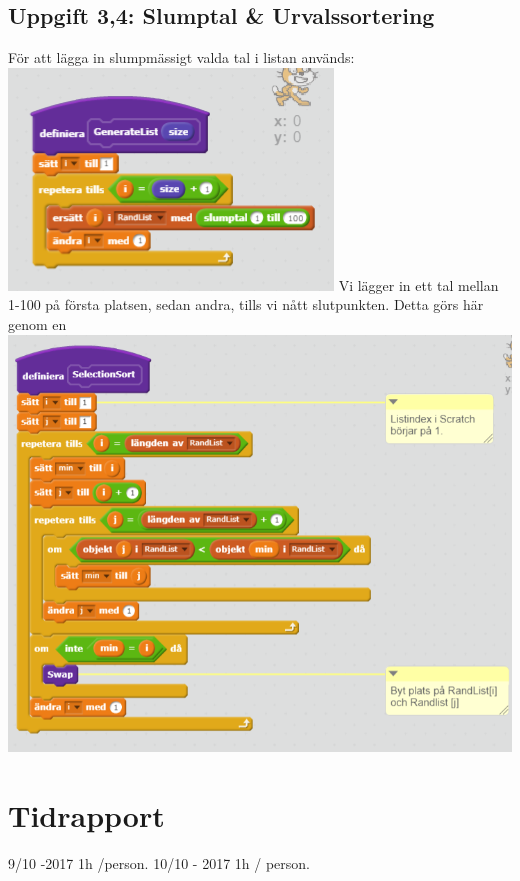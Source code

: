 \documentclass[12pt,a4paper]{article}
\begin{document}
\subsection{Uppgift 3,4: Slumptal \& Urvalssortering}
För att lägga in slumpmässigt valda tal i listan används: \\ \includegraphics[scale=1]{listgen}
Vi lägger in ett tal mellan 1-100 på första platsen, sedan andra, tills vi nått slutpunkten. Detta görs här genom en 
 \\
 \includegraphics[scale=0.8]{selection}
\section{Tidrapport}
9/10 -2017 1h /person. 
10/10 - 2017 1h / person. 
\end{document}
